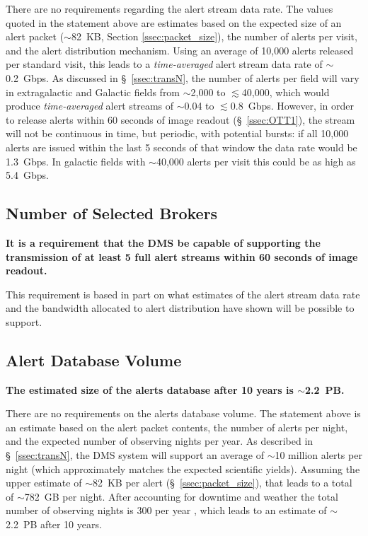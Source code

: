 \documentclass[DM,authoryear,toc]{lsstdoc}
\begin{document}
There are no requirements regarding the alert stream data rate. The values quoted in the statement above are estimates based on the expected size of an alert packet ($\sim$82~KB, Section \ref{ssec:packet_size}), the number of alerts per visit, and the alert distribution mechanism. Using an average of 10,000 alerts released per standard visit, this leads to a {\it time-averaged} alert stream data rate of  $\sim$0.2~Gbps. As discussed in \S~\ref{ssec:transN}, the number of alerts per field will vary in extragalactic and Galactic fields from $\sim$2,000 to $\lesssim$40,000, which would produce {\it time-averaged} alert streams of $\sim$0.04 to $\lesssim$0.8~Gbps. However, in order to release alerts within 60 seconds of image readout (\S~\ref{ssec:OTT1}), the stream will not be continuous in time, but periodic, with potential bursts: if all 10,000 alerts are issued within the last 5 seconds of that window the data rate would be 1.3~Gbps. In galactic fields with $\sim$40,000 alerts per visit this could be as high as 5.4~Gbps.


\subsection{Number of Selected Brokers}\label{ssec:num_brokers}

{\bf It is a requirement that the \gls{DMS} be capable of supporting the transmission of at least 5 full alert streams within 60 seconds of image readout.}

This requirement is based in part on what estimates of the alert stream data rate and the bandwidth allocated to alert distribution have shown will be possible to support. 

\subsection{Alert Database Volume}\label{ssec:adb_volume}

{\bf The estimated size of the alerts database after 10 years is $\sim$2.2~PB.}

There are no requirements on the alerts database volume. The statement above is an estimate based on the alert packet contents, the number of alerts per night, and the expected number of observing nights per year. As described in \S~\ref{ssec:transN}, the \gls{DMS} system will support an average of $\sim$10 million alerts per night (which approximately matches the expected scientific yields). Assuming the upper estimate of $\sim$82~KB per alert (\S~\ref{ssec:packet_size}), that leads to a total of $\sim$782~GB per night. After accounting for downtime and weather the total number of observing nights is 300 per year , which leads to an estimate of $\sim$2.2~PB after 10 years.
\end{document}
